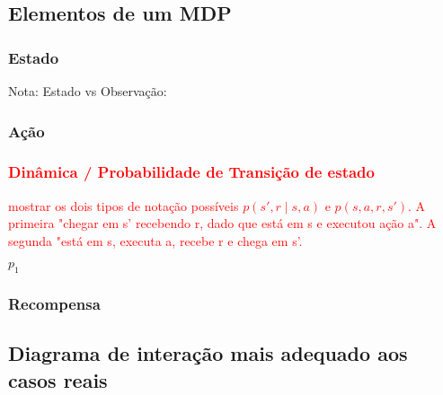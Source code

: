 \documentclass{article}
\begin{document}
        \subsection{Elementos de um MDP}
    
            \subsubsection{Estado}
            
                
                Nota: Estado vs Observação: 
                
            \subsubsection{Ação}
            
                
            \subsubsection{\textcolor{red}{Dinâmica / Probabilidade de Transição de estado}}
            
                \textcolor{red}{mostrar os dois tipos de notação possíveis $p(s', r \mid s, a)$ e $p(s, a, r, s')$. A primeira "chegar em s' recebendo r, dado que está em s e executou ação a". A segunda "está em s, executa a, recebe r e chega em s'.}
        
                $p_1$
                
            \subsubsection{Recompensa}
        
                
        \subsection{Diagrama de interação mais adequado aos casos reais}
        
\end{document}

